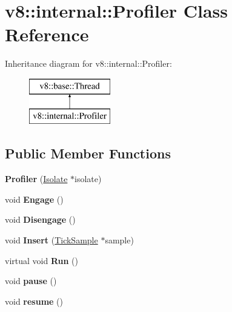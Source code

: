 \hypertarget{classv8_1_1internal_1_1_profiler}{}\section{v8\+:\+:internal\+:\+:Profiler Class Reference}
\label{classv8_1_1internal_1_1_profiler}
Inheritance diagram for v8\+:\+:internal\+:\+:Profiler\+:\begin{figure}[H]
\begin{center}
\leavevmode
\includegraphics[height=2.000000cm]{classv8_1_1internal_1_1_profiler}
\end{center}
\end{figure}
\subsection*{Public Member Functions}
\begin{DoxyCompactItemize}
\item 
{\bfseries Profiler} (\hyperlink{classv8_1_1internal_1_1_isolate}{Isolate} $\ast$isolate)\hypertarget{classv8_1_1internal_1_1_profiler_a183ac1da05bdb6f14004fe2b72d330f8}{}\label{classv8_1_1internal_1_1_profiler_a183ac1da05bdb6f14004fe2b72d330f8}

\item 
void {\bfseries Engage} ()\hypertarget{classv8_1_1internal_1_1_profiler_a5fde7f32f57422fb4a946e3c6c23a0b8}{}\label{classv8_1_1internal_1_1_profiler_a5fde7f32f57422fb4a946e3c6c23a0b8}

\item 
void {\bfseries Disengage} ()\hypertarget{classv8_1_1internal_1_1_profiler_aa4bf57a012df19cf1a5760086726930e}{}\label{classv8_1_1internal_1_1_profiler_aa4bf57a012df19cf1a5760086726930e}

\item 
void {\bfseries Insert} (\hyperlink{structv8_1_1internal_1_1_tick_sample}{Tick\+Sample} $\ast$sample)\hypertarget{classv8_1_1internal_1_1_profiler_aa16ebe6474f389da1823168299163ae1}{}\label{classv8_1_1internal_1_1_profiler_aa16ebe6474f389da1823168299163ae1}

\item 
virtual void {\bfseries Run} ()\hypertarget{classv8_1_1internal_1_1_profiler_a50d91468733e852bbb37cc7249f98bb7}{}\label{classv8_1_1internal_1_1_profiler_a50d91468733e852bbb37cc7249f98bb7}

\item 
void {\bfseries pause} ()\hypertarget{classv8_1_1internal_1_1_profiler_a6d5b6053f67b64fab12a5b891cf4adf5}{}\label{classv8_1_1internal_1_1_profiler_a6d5b6053f67b64fab12a5b891cf4adf5}

\item 
void {\bfseries resume} ()\hypertarget{classv8_1_1internal_1_1_profiler_a4c9f3df2a75d5c6d26341b959f703a8d}{}\label{classv8_1_1internal_1_1_profiler_a4c9f3df2a75d5c6d26341b959f703a8d}

\end{DoxyCompactItemize}

